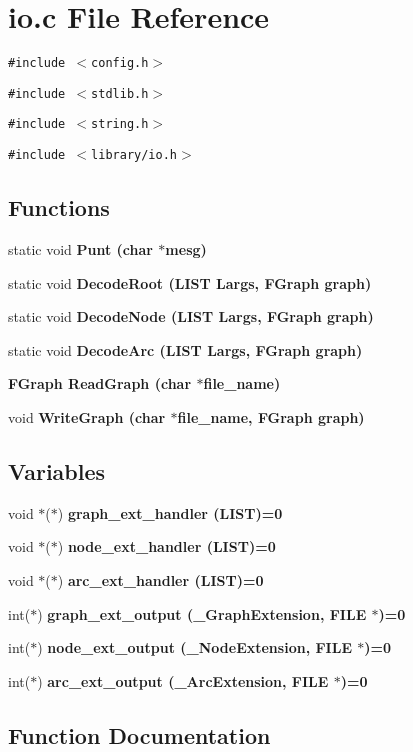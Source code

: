 \section{io.c File Reference}
\label{io_8c}
{\tt \#include $<$config.h$>$}\par
{\tt \#include $<$stdlib.h$>$}\par
{\tt \#include $<$string.h$>$}\par
{\tt \#include $<$library/io.h$>$}\par
\subsection*{Functions}
\begin{CompactItemize}
\item 
static void \bf{Punt} (char $\ast$mesg)
\item 
static void \bf{Decode\-Root} (\bf{LIST} Largs, \bf{FGraph} \bf{graph})
\item 
static void \bf{Decode\-Node} (\bf{LIST} Largs, \bf{FGraph} \bf{graph})
\item 
static void \bf{Decode\-Arc} (\bf{LIST} Largs, \bf{FGraph} \bf{graph})
\item 
\bf{FGraph} \bf{Read\-Graph} (char $\ast$file\_\-name)
\item 
void \bf{Write\-Graph} (char $\ast$file\_\-name, \bf{FGraph} \bf{graph})
\end{CompactItemize}
\subsection*{Variables}
\begin{CompactItemize}
\item 
void $\ast$($\ast$) \bf{graph\_\-ext\_\-handler} (\bf{LIST})=0
\item 
void $\ast$($\ast$) \bf{node\_\-ext\_\-handler} (\bf{LIST})=0
\item 
void $\ast$($\ast$) \bf{arc\_\-ext\_\-handler} (\bf{LIST})=0
\item 
int($\ast$) \bf{graph\_\-ext\_\-output} (\bf{\_\-Graph\-Extension}, FILE $\ast$)=0
\item 
int($\ast$) \bf{node\_\-ext\_\-output} (\bf{\_\-Node\-Extension}, FILE $\ast$)=0
\item 
int($\ast$) \bf{arc\_\-ext\_\-output} (\bf{\_\-Arc\-Extension}, FILE $\ast$)=0
\end{CompactItemize}


\subsection{Function Documentation}
